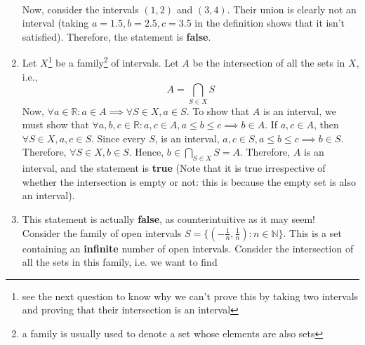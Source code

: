 \documentclass{article}
\begin{document}
\begin{enumerate}
	\\Now, consider the intervals $(1, 2)$ and $(3, 4)$. Their union is clearly not an interval (taking $a = 1.5, b = 2.5, c = 3.5$ in the definition shows that it isn't satisfied). Therefore, the statement is \textbf{false}.
	\item Let $X$\footnote[1]{see the next question to know why we can't prove this by taking two intervals and proving that their intersection is an interval} be a family\footnote[2]{a family is usually used to denote a set whose elements are also sets} of intervals. Let $A$ be the intersection of all the sets in $X$, i.e.,
	\begin{equation*}
		A = \bigcap_{S \in X} S
	\end{equation*}
	Now, $\forall a \in \mathbb{R}: a \in A \implies \forall S \in X, a \in S$. To show that $A$ is an interval, we must show that $\forall a, b, c \in \mathbb{R}: a, c \in A, a \leq b \leq c \implies b \in A$.
	If $a, c \in A$, then $\forall S \in X, a, c \in S$. Since every $S$, is an interval, $a, c \in S, a \leq b \leq c \implies b \in S$. Therefore, $\forall S \in X, b \in S$.
	Hence, $b \in \bigcap_{S \in X} S = A$. Therefore, $A$ is an interval, and the statement is \textbf{true} (Note that it is true irrespective of whether the intersection is empty or not: this is because the empty set is also an interval).
	\item This statement is actually \textbf{false}, as counterintuitive as it may seem!\\
	Consider the family of open intervals $S = \{(-\frac{1}{n}, \frac{1}{n}) : n \in \mathbb{N}\}$. This is a set containing an \textbf{infinite} number of open intervals.
	Consider the intersection of all the sets in this family, i.e. we want to find

\end{enumerate}
\end{document}
